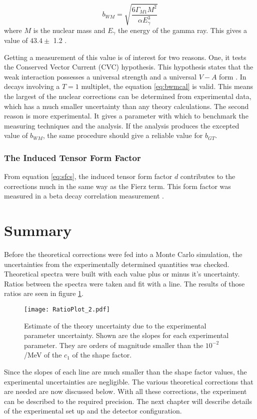 \documentclass[../MaxHughesThesis.tex]{subfiles}
\begin{document}
\begin{equation}
	b_{WM} = \sqrt{\frac{6\Gamma_{M1}M^{2}}{\alpha E_{\gamma}^{3}}}
	\label{eq:bwmcal}
\end{equation}
where $M$ is the nuclear mass and $E_{\gamma}$ the energy of the gamma ray.
This gives a value of $43.4 \pm$ 1.2 \cite{Min11}.

Getting a measurement of this value is of interest for two reasons.
One, it tests the Conserved Vector Current (CVC) hypothesis.
This hypothesis states that the weak interaction possesses a universal strength and a universal $V-A$ form \cite{Man58}.
In decays involving a $T = 1$ multiplet, the equation \ref{eq:bwmcal} is valid. 
This means the largest of the nuclear corrections can be determined from experimental data, which has a much smaller uncertainty than any theory calculations.
The second reason is more experimental.
It gives a parameter with which to benchmark the measuring techniques and the analysis.
If the analysis produces the excepted value of $b_{WM}$, the same procedure should give a reliable value for $b_{GT}$.

\subsubsection{The Induced Tensor Form Factor}
From equation \ref{eq:sfcs}, the induced tensor form factor $d$ contributes to the corrections much in the same way as the Fierz term.
This form factor was measured in a beta decay correlation measurement \cite{Min11}.


\section{Summary}

Before the theoretical corrections were fed into a Monte Carlo simulation, the uncertainties from the experimentally determined quantities was checked.
Theoretical spectra were  built with each value plus or minus it's uncertainty.
Ratios between the spectra were taken and fit with a line.
The results of those ratios are seen in figure \ref{fig:theoryuncer}.

\begin{figure}[!htb]
	\centerline{\texttt{[image: RatioPlot\_2.pdf]}}
	\caption{Estimate of the theory uncertainty due to the experimental parameter uncertainty.	
		 Shown are the slopes for each experimental parameter. 
		 They are orders of magnitude smaller than the $10^{-2}$/MeV of the $c_{1}$ of the shape factor.}
	\label{fig:theoryuncer}
\end{figure}

Since the slopes of each line are much smaller than the shape factor values, the experimental uncertainties are negligible. 
The various theoretical corrections that are needed are now discussed below.
With all these corrections, the experiment can be described to the required precision.
The next chapter will describe details of the experimental set up and the detector configuration.
\end{document}
